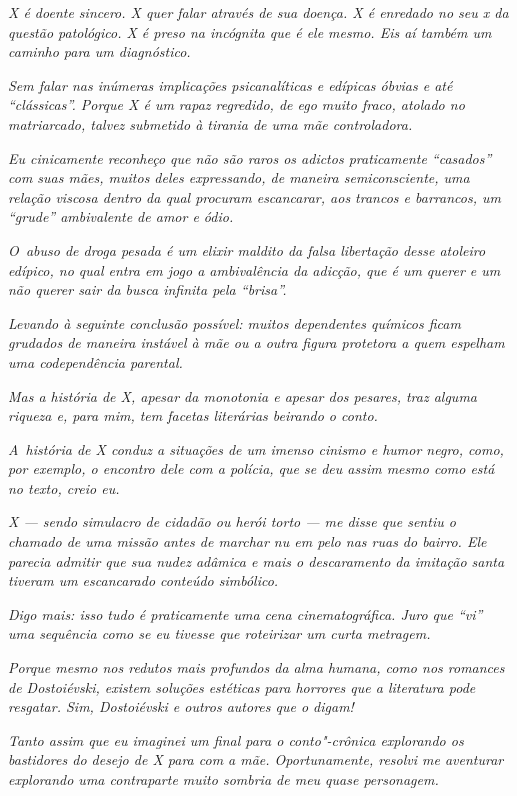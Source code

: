 \emph{X é doente sincero. X quer falar através de sua doença. X é
enredado no seu x da questão patológico. X é preso na incógnita que é
ele mesmo. Eis aí também um caminho para um diagnóstico.}

\emph{Sem falar nas inúmeras implicações psicanalíticas e edípicas
óbvias e até ``clássicas''. Porque X é um rapaz regredido, de ego muito
fraco, atolado no matriarcado, talvez submetido à tirania de uma mãe
controladora.}

\emph{Eu cinicamente reconheço que não são raros os adictos praticamente
``casados'' com suas mães, muitos deles expressando, de maneira semiconsciente, uma relação viscosa dentro da qual procuram escancarar, aos
trancos e barrancos, um ``grude'' ambivalente de amor e ódio.}

\emph{O~abuso de droga pesada é um elixir maldito da falsa libertação
desse atoleiro edípico, no qual entra em jogo a ambivalência da adicção,
que é um querer e um não querer sair da busca infinita pela ``brisa''.}

\emph{Levando à seguinte conclusão possível: muitos dependentes químicos
ficam grudados de maneira instável à mãe ou a outra figura protetora a
quem espelham uma codependência parental.}

\emph{Mas a história de X, apesar da monotonia e apesar dos pesares, traz
alguma riqueza e, para mim, tem facetas literárias beirando o conto.}

\emph{A~história de X conduz a situações de um imenso cinismo e humor
negro, como, por exemplo, o encontro dele com a polícia, que se deu
assim mesmo como está no texto, creio eu.}

\emph{X --- sendo simulacro de cidadão ou herói torto --- me disse que
sentiu o chamado de uma missão antes de marchar nu em pelo nas ruas do
bairro. Ele parecia admitir que sua nudez adâmica e mais o descaramento
da imitação santa tiveram um escancarado conteúdo simbólico.}

\emph{Digo mais: isso tudo é praticamente uma cena cinematográfica. Juro
que ``vi'' uma sequência como se eu tivesse que roteirizar um curta
metragem.}

\emph{Porque mesmo nos redutos mais profundos da alma humana, como nos
romances de Dostoiévski, existem soluções estéticas para horrores que a
literatura pode resgatar. Sim, Dostoiévski e outros autores que o
digam!}

\emph{Tanto assim que eu imaginei um final para o conto"-crônica
explorando os bastidores do desejo de X para com a mãe. Oportunamente,
resolvi me aventurar explorando uma contraparte muito sombria de meu
quase personagem.}

